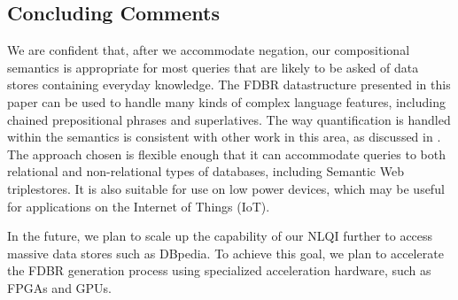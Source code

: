 \documentclass[../main.tex]{subfiles}
\begin{document}
\begin{refsection}
\section{Concluding Comments}

We are confident that, after we accommodate negation, our compositional semantics is appropriate for most queries that are likely to be asked of data stores containing everyday knowledge.
The FDBR datastructure presented in this paper can be used to handle many kinds of complex language features, including chained prepositional phrases and superlatives.  The way quantification is handled within the semantics is consistent with other work in this area, as discussed in . 
The approach chosen is flexible enough that it can accommodate queries to both relational and non-relational types of databases, including Semantic Web triplestores.  It is also suitable for use on low power devices, which may be useful for applications on the Internet of Things (IoT).

In the future, we plan to scale up the capability of our NLQI further to access massive data stores such as DBpedia.  To achieve this goal, we plan to accelerate the FDBR generation process using specialized acceleration hardware, such as FPGAs and GPUs.

\printbibliography[heading=subbibintoc]
\end{refsection}
\end{document}
